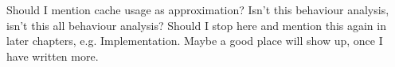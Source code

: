 Should I mention cache usage as approximation? Isn't this behaviour analysis,
isn't this all behaviour analysis?
Should I stop here and mention this again in later chapters, e.g.
Implementation. Maybe a good place will show up, once I have written more.



\begin{comment}
\paragraph{performance expectation}
But how can a performance expectation be formulated, without offline
measurements or a separate online measurement phase?
If a thread is scheduled the first time, no performance or resource information
is available.
The thread can be placed on the core with the least threads or with the lowest
cache weight. \todo{did I explain cache weight already?}
At the next interval boundary, the thread is measured and a performance
prediction is formulated.
Based on this prediction the thread can be placed by the chosen scheme,
e.g. cache weight.

\paragraph{performance measurement}
But does this measurement at interval boundaries actually describe the
performance of the co-schedule?
Three cases must be considered during an interval:
(A) a thread runs solo on a physical core,
(B) a thread runs together with one other thread on a physical core and each
thread executes on one logical core, and
(C) more than two threads run on the same physical core.
In case (A), the measurement describes the solo execution performance and
resource usage.
Case (B)'s measurement actually provides the co-schedule performance for both
threads.
And case (C) provides no reliable information at all.
If three threads are present, two of them, say \alpha{} and \beta{}, are assumed to
execute in parallel at each point in time.
During the interval the combination will change, so \alpha{} and \gamma{} will be
co-scheduled for some time and likewise \beta{} and \gamma{} and \alpha{} and
\beta{}.
The measurement takes place at the end of an interval, with no information
about how long which thread combination was executing together. So no
co-schedule performance statement for each pair of threads can be made.

This example is simplified to ease the argumentation, in reality two additional
problems must be considered.
First, the \gls{llc} of the target hardare is shared among all four physical cores,
hence the performance of each core local co-schedule is influenced by
co-schedules on other cores, too.
Second, the possible thread combinations are either (\alpha, \beta) and
(\gamma, \beta), (\alpha, \beta) and (\alpha, \gamma), or (\alpha, \gamma) and
(\beta, \gamma), because no scheduling decisions take place during an interval.
\todo{make it clear, that each combination is the result of the last
assignment?}
So one of the three threads can execute for the whole interval and the other
two execute for half an interval each.


\end{comment}
